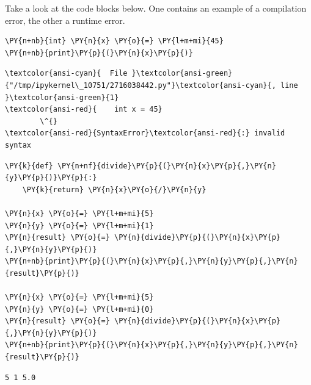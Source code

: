 Take a look at the code blocks below. One contains an example of a
compilation error, the other a runtime error.

    \begin{tcolorbox}[breakable, size=fbox, boxrule=1pt, pad at break*=1mm,colback=cellbackground, colframe=cellborder]
\begin{Verbatim}[commandchars=\\\{\}]
\PY{n+nb}{int} \PY{n}{x} \PY{o}{=} \PY{l+m+mi}{45}
\PY{n+nb}{print}\PY{p}{(}\PY{n}{x}\PY{p}{)}
\end{Verbatim}
\end{tcolorbox}

    \begin{Verbatim}[commandchars=\\\{\}, frame=single, framerule=2mm, rulecolor=\color{outerrorbackground}]
\textcolor{ansi-cyan}{  File }\textcolor{ansi-green}{"/tmp/ipykernel\_10751/2716038442.py"}\textcolor{ansi-cyan}{, line }\textcolor{ansi-green}{1}
\textcolor{ansi-red}{    int x = 45}
        \^{}
\textcolor{ansi-red}{SyntaxError}\textcolor{ansi-red}{:} invalid syntax

    \end{Verbatim}

    \begin{tcolorbox}[breakable, size=fbox, boxrule=1pt, pad at break*=1mm,colback=cellbackground, colframe=cellborder]
\begin{Verbatim}[commandchars=\\\{\}]
\PY{k}{def} \PY{n+nf}{divide}\PY{p}{(}\PY{n}{x}\PY{p}{,}\PY{n}{y}\PY{p}{)}\PY{p}{:}
    \PY{k}{return} \PY{n}{x}\PY{o}{/}\PY{n}{y}

\PY{n}{x} \PY{o}{=} \PY{l+m+mi}{5}
\PY{n}{y} \PY{o}{=} \PY{l+m+mi}{1}
\PY{n}{result} \PY{o}{=} \PY{n}{divide}\PY{p}{(}\PY{n}{x}\PY{p}{,}\PY{n}{y}\PY{p}{)}
\PY{n+nb}{print}\PY{p}{(}\PY{n}{x}\PY{p}{,}\PY{n}{y}\PY{p}{,}\PY{n}{result}\PY{p}{)}

\PY{n}{x} \PY{o}{=} \PY{l+m+mi}{5}
\PY{n}{y} \PY{o}{=} \PY{l+m+mi}{0}
\PY{n}{result} \PY{o}{=} \PY{n}{divide}\PY{p}{(}\PY{n}{x}\PY{p}{,}\PY{n}{y}\PY{p}{)}
\PY{n+nb}{print}\PY{p}{(}\PY{n}{x}\PY{p}{,}\PY{n}{y}\PY{p}{,}\PY{n}{result}\PY{p}{)}
\end{Verbatim}
\end{tcolorbox}

    \begin{Verbatim}[commandchars=\\\{\}]
5 1 5.0
    \end{Verbatim}

